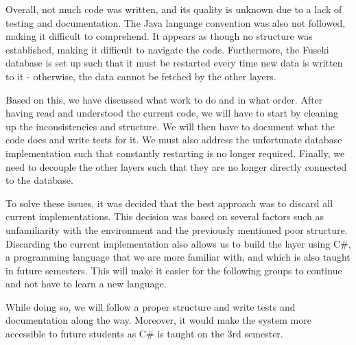 Overall, not much code was written, and its quality is unknown due to a lack of testing and documentation.
The Java language convention was also not followed\cite{java_convention}, making it difficult to comprehend.
It appears as though no structure was established, making it difficult to navigate the code. 
Furthermore, the Fuseki database is set up such that it must be restarted every time new data is written to it - otherwise, the data cannot be fetched by the other layers\cite{knox2020}.

Based on this, we have discussed what work to do and in what order.
After having read and understood the current code, we will have to start by cleaning up the inconsistencies and structure.
We will then have to document what the code does and write tests for it.
We must also address the unfortunate database implementation such that constantly restarting is no longer required.
Finally, we need to decouple the other layers such that they are no longer directly connected to the  database.

To solve these issues, it was decided that the best approach was to discard all current implementations. 
This decision was based on several factors such as unfamiliarity with the environment and the previously mentioned poor structure. 
Discarding the current implementation also allows us to build the layer using C\#, a programming language that we are more familiar with, and which is also taught in future semesters. 
This will make it easier for the following groups to continue and not have to learn a new language.

While doing so, we will follow a proper structure and write tests and documentation along the way. 
Moreover, it would make the system more accessible to future students as C\# is taught on the 3rd semester.